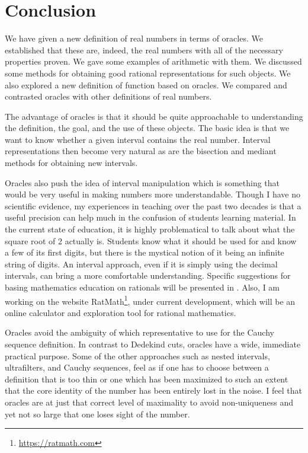 \documentclass[12pt]{article}
\begin{document}
\section{Conclusion}

We have given a new definition of real numbers in terms of oracles. We established that these are, indeed, the real numbers with all of the necessary properties proven. We gave some examples of arithmetic with them. We discussed some methods for obtaining good rational representations for such objects. We also explored a new definition of function based on oracles. We compared and contrasted oracles with other definitions of real numbers. 

The advantage of oracles is that it should be quite approachable to understanding the definition, the goal, and the use of these objects. The basic idea is that we want to know whether a given interval contains the real number. Interval representations then become very natural as are the bisection and mediant methods for obtaining new intervals. 

Oracles also push the idea of interval manipulation which is something that would be very useful in making numbers more understandable. Though I have no scientific evidence, my experiences in teaching over the past two decades is that a useful precision can help much in the confusion of students learning material. In the current state of education, it is highly problematical to talk about what the square root of 2 actually is. Students know what it should be used for and know a few of its first digits, but there is the mystical notion of it being an infinite string of digits. An interval approach, even if it is simply using the decimal intervals, can bring a more comfortable understanding. Specific suggestions for basing mathematics education on rationals will be presented in \cite{taylor23edu}. Also, I am working on the website RatMath\footnote{\url{https://ratmath.com}}, under current development, which will be an online calculator and exploration tool for rational mathematics. 

Oracles avoid the ambiguity of which representative to use for the Cauchy sequence definition. In contrast to Dedekind cuts, oracles have a wide, immediate practical purpose. Some of the other approaches such as nested intervals, ultrafilters, and Cauchy sequences, feel as if one has to choose between a definition that is too thin or one which has been maximized to such an extent that the core identity of the number has been entirely lost in the noise. I feel that oracles are at just that correct level of maximality to avoid non-uniqueness and yet not so large that one loses sight of the number. 
\end{document}
